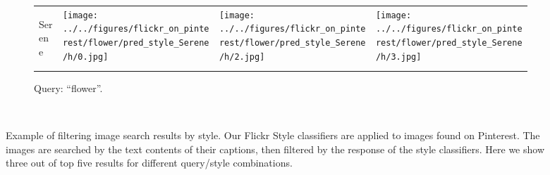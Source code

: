 \begin{figure}
\begin{subfigure}[t]{0.48\linewidth}
\begin{tabular}{m{.02in}|m{\dgap} m{\dgap} m{\dgap}}
    \begin{turn}{90}\small{Serene}\end{turn} &
    \texttt{[image: ../../figures/flickr\_on\_pinterest/flower/pred\_style\_Serene/h/0.jpg]} &
    \texttt{[image: ../../figures/flickr\_on\_pinterest/flower/pred\_style\_Serene/h/2.jpg]} &
    \texttt{[image: ../../figures/flickr\_on\_pinterest/flower/pred\_style\_Serene/h/3.jpg]} \\
    \end{tabular}
    \caption{Query: ``flower''.}
\end{subfigure}
\\
\caption{
    Example of filtering image search results by style.
    Our Flickr Style classifiers are applied to images found on Pinterest.
    The images are searched by the text contents of their captions, then filtered by the response of the style classifiers.
    Here we show three out of top five results for different query/style combinations.
}\label{fig:flickr_on_pinterest}
\end{figure}
